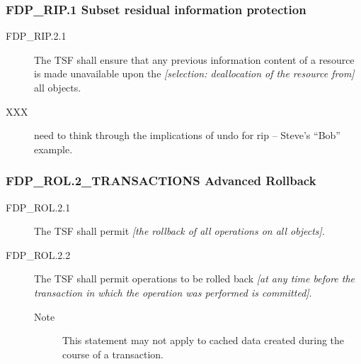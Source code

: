 \documentclass[10pt,a4paper,english]{article}
\begin{document}

\hypertarget{fdp-rip-1-subset-residual-information-protection}{}
\subsubsection*{FDP{\_}RIP.1 Subset residual information protection}
\begin{description}
\item[FDP{\_}RIP.2.1]

The TSF shall ensure that any previous information content of a
resource is made unavailable upon the \emph{{[}selection: deallocation of
the resource from]} all objects.

\item[XXX ]

need to think through the implications of undo for rip -- Steve's
``Bob'' example.

\end{description}



\hypertarget{fdp-rol-2-transactions-advanced-rollback}{}
\subsubsection*{FDP{\_}ROL.2{\_}TRANSACTIONS Advanced Rollback}
\begin{description}
\item[FDP{\_}ROL.2.1 ]

The TSF shall permit \emph{{[}the rollback of all
operations on all objects]}.

\item[FDP{\_}ROL.2.2 ]

The TSF shall permit operations to be rolled
back \emph{{[}at any time before the transaction in which the operation was
performed is committed]}.
\begin{description}
\item[Note ]

This statement may not apply to cached data created
during the course of a transaction.

\end{description}

\end{description}
\end{document}

